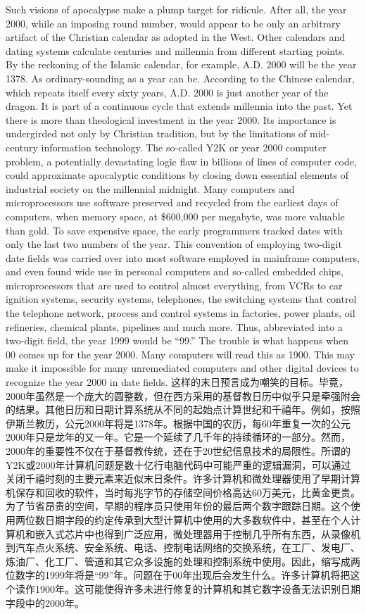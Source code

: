 \begin{Parallel}{97mm}{45mm}
  \ParallelLText
  {Such visions of apocalypse make a plump target for ridicule. After all, the year 2000, while an imposing round number, would appear to be only an arbitrary artifact of the Christian calendar as adopted in the West. Other calendars and dating systems calculate centuries and millennia from different starting points. By the reckoning of the Islamic calendar, for example, A.D. 2000 will be the year 1378. As ordinary-sounding as a year can be. According to the Chinese calendar, which repeats itself every sixty years, A.D. 2000 is just another year of the dragon. It is part of a continuous cycle that extends millennia into the past. Yet there is more than theological investment in the year 2000. Its importance is undergirded not only by Christian tradition, but by the limitations of mid-century information technology. The so-called Y2K or year 2000 computer problem, a potentially devastating logic flaw in billions of lines of computer code, could approximate apocalyptic conditions by closing down essential elements of industrial society on the millennial midnight. Many computers and microprocessors use software preserved and recycled from the earliest days of computers, when memory space, at \$600,000 per megabyte, was more valuable than gold. To save expensive space, the early programmers tracked dates with only the last two numbers of the year. This convention of employing two-digit date fields was carried over into most software employed in mainframe computers, and even found wide use in personal computers and so-called embedded chips, microprocessors that are used to control almost everything, from VCRs to car ignition systems, security systems, telephones, the switching systems that control the telephone network, process and control systems in factories, power plants, oil refineries, chemical plants, pipelines and much more. Thus, abbreviated into a two-digit field, the year 1999 would be “99.” The trouble is what happens when 00 comes up for the year 2000. Many computers will read this as 1900. This may make it impossible for many unremediated computers and other digital devices to recognize the year 2000 in date fields.}  
  \ParallelRText
  {\small 这样的末日预言成为嘲笑的目标。毕竟，2000年虽然是一个庞大的圆整数，但在西方采用的基督教日历中似乎只是牵强附会的结果。其他日历和日期计算系统从不同的起始点计算世纪和千禧年。例如，按照伊斯兰教历，公元2000年将是1378年。根据中国的农历，每60年重复一次的公元2000年只是龙年的又一年。它是一个延续了几千年的持续循环的一部分。然而，2000年的重要性不仅在于基督教传统，还在于20世纪信息技术的局限性。所谓的Y2K或2000年计算机问题是数十亿行电脑代码中可能严重的逻辑漏洞，可以通过关闭千禧时刻的主要元素来近似末日条件。许多计算机和微处理器使用了早期计算机保存和回收的软件，当时每兆字节的存储空间价格高达60万美元，比黄金更贵。为了节省昂贵的空间，早期的程序员只使用年份的最后两个数字跟踪日期。这个使用两位数日期字段的约定传承到大型计算机中使用的大多数软件中，甚至在个人计算机和嵌入式芯片中也得到广泛应用，微处理器用于控制几乎所有东西，从录像机到汽车点火系统、安全系统、电话、控制电话网络的交换系统，在工厂、发电厂、炼油厂、化工厂、管道和其它众多设施的处理和控制系统中使用。因此，缩写成两位数字的1999年将是“99”年。问题在于00年出现后会发生什么。许多计算机将把这个读作1900年。这可能使得许多未进行修复的计算机和其它数字设备无法识别日期字段中的2000年。}

\end{Parallel}
